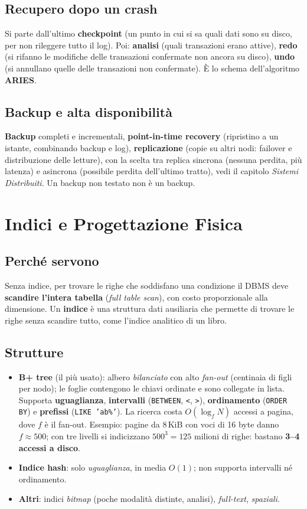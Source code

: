 \subsection{Recupero dopo un crash}
Si parte dall'ultimo \textbf{checkpoint} (un punto in cui si sa quali dati sono su disco, per non rileggere tutto il log). Poi: \textbf{analisi} (quali transazioni erano attive), \textbf{redo} (si rifanno le modifiche delle transazioni confermate non ancora su disco), \textbf{undo} (si annullano quelle delle transazioni non confermate). È lo schema dell'algoritmo \textbf{ARIES}.

\subsection{Backup e alta disponibilità}
\textbf{Backup} completi e incrementali, \textbf{point-in-time recovery} (ripristino a un istante, combinando backup e log), \textbf{replicazione} (copie su altri nodi: failover e distribuzione delle letture), con la scelta tra replica sincrona (nessuna perdita, più latenza) e asincrona (possibile perdita dell'ultimo tratto), vedi il capitolo \emph{Sistemi Distribuiti}. Un backup non testato non è un backup.

\section{Indici e Progettazione Fisica}

\subsection{Perché servono}
Senza indice, per trovare le righe che soddisfano una condizione il DBMS deve \textbf{scandire l'intera tabella} (\emph{full table scan}), con costo proporzionale alla dimensione. Un \textbf{indice} è una struttura dati ausiliaria che permette di trovare le righe senza scandire tutto, come l'indice analitico di un libro.

\subsection{Strutture}
\begin{itemize}
    \item \textbf{B+ tree} (il più usato): albero \emph{bilanciato} con alto \emph{fan-out} (centinaia di figli per nodo); le foglie contengono le chiavi ordinate e sono collegate in lista. Supporta \textbf{uguaglianza}, \textbf{intervalli} (\texttt{BETWEEN}, \texttt{<}, \texttt{>}), \textbf{ordinamento} (\texttt{ORDER BY}) e \textbf{prefissi} (\texttt{LIKE 'ab\%'}). La ricerca costa $O(\log_f N)$ accessi a pagina, dove $f$ è il fan-out. Esempio: pagine da 8\,KiB con voci di 16 byte danno $f\approx 500$; con tre livelli si indicizzano $500^3 = 125$ milioni di righe: bastano \textbf{3--4 accessi a disco}.
    \item \textbf{Indice hash}: solo \emph{uguaglianza}, in media $O(1)$; non supporta intervalli né ordinamento.
    \item \textbf{Altri}: indici \emph{bitmap} (poche modalità distinte, analisi), \emph{full-text}, \emph{spaziali}.
\end{itemize}

